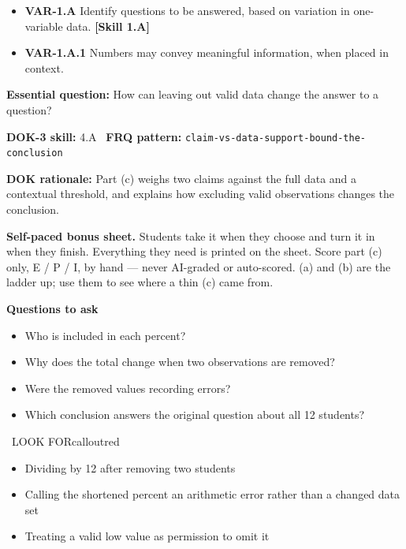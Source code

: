 \documentclass[11pt]{article}
\begin{document}


{\small
\begin{itemize}[leftmargin=1.5em,itemsep=2pt,topsep=2pt]
  \item \textbf{VAR-1.A} Identify questions to be answered, based on variation in one-variable data. \textbf{[Skill 1.A]}
  \item \textbf{VAR-1.A.1} Numbers may convey meaningful information, when placed in context.
\end{itemize}
}
\textbf{Essential question:} How can leaving out valid data change the answer to a question?\par
\textbf{DOK-3 skill:} 4.A \textperiodcentered\ \textbf{FRQ pattern:} {\small\texttt{claim-\allowbreak{}vs-\allowbreak{}data-\allowbreak{}support-\allowbreak{}bound-\allowbreak{}the-\allowbreak{}conclusion}}\par
\textbf{DOK rationale:} Part (c) weighs two claims against the full data and a contextual threshold, and explains how excluding valid observations changes the conclusion.\par

\textbf{Self-paced bonus sheet.} Students take it when they choose and turn it in when they finish. Everything they need is printed on the sheet. Score part (c) only, E / P / I, by hand --- never AI-graded or auto-scored. (a) and (b) are the ladder up; use them to see where a thin (c) came from.\par

\textbf{Questions to ask}
\begin{itemize}[leftmargin=1.5em,itemsep=2pt,topsep=2pt]
  \item Who is included in each percent?
  \item Why does the total change when two observations are removed?
  \item Were the removed values recording errors?
  \item Which conclusion answers the original question about all 12 students?
\end{itemize}

\begin{callout}{\IconWarn\ LOOK FOR}{calloutred}
\begin{itemize}[leftmargin=1.5em,itemsep=2pt,topsep=2pt]
  \item Dividing by 12 after removing two students
  \item Calling the shortened percent an arithmetic error rather than a changed data set
  \item Treating a valid low value as permission to omit it
\end{itemize}
\end{callout}
\end{document}

